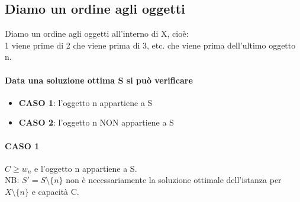 \subsection{Diamo un ordine agli oggetti}
Diamo un ordine agli oggetti all'interno di X, cioè:\\
1 viene prime di 2 che viene prima di 3, etc. che viene prima dell'ultimo oggetto n.\\
\paragraph*{Data una soluzione ottima S si può verificare}
\begin{itemize}
    \item \textbf{CASO 1}: l'oggetto n appartiene a S
    \item \textbf{CASO 2}: l'oggetto n NON appartiene a S
\end{itemize}
\paragraph*{CASO 1} $C \geq w_n$ e l'oggetto n appartiene a S.\\
NB: $S' = S \setminus \{n\}$ non è necessariamente la soluzione ottimale dell'istanza per
$X \setminus \{n\}$ e capacità C.

